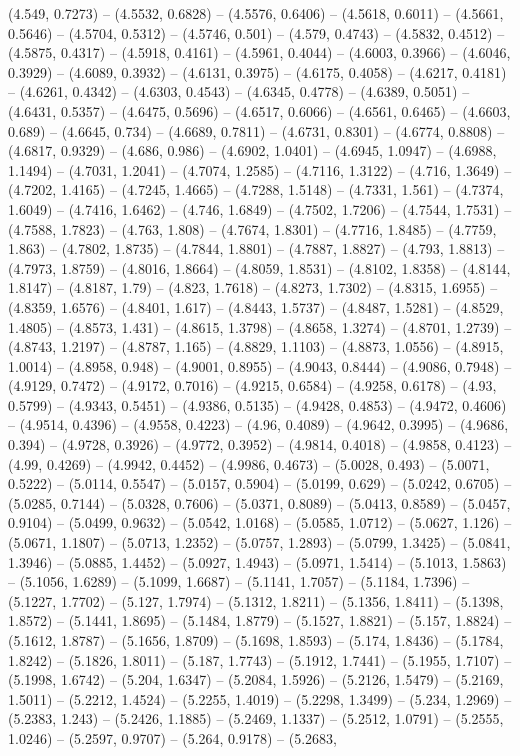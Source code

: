 (4.549, 0.7273) -- (4.5532, 0.6828) -- (4.5576, 0.6406) -- (4.5618, 0.6011) -- (4.5661, 0.5646) -- (4.5704, 0.5312) -- (4.5746, 0.501) -- (4.579, 0.4743) -- (4.5832, 0.4512) -- (4.5875, 0.4317) -- (4.5918, 0.4161) -- (4.5961, 0.4044) -- (4.6003, 0.3966) -- (4.6046, 0.3929) -- (4.6089, 0.3932) -- (4.6131, 0.3975) -- (4.6175, 0.4058) -- (4.6217, 0.4181) -- (4.6261, 0.4342) -- (4.6303, 0.4543) -- (4.6345, 0.4778) -- (4.6389, 0.5051) -- (4.6431, 0.5357) -- (4.6475, 0.5696) -- (4.6517, 0.6066) -- (4.6561, 0.6465) -- (4.6603, 0.689) -- (4.6645, 0.734) -- (4.6689, 0.7811) -- (4.6731, 0.8301) -- (4.6774, 0.8808) -- (4.6817, 0.9329) -- (4.686, 0.986) -- (4.6902, 1.0401) -- (4.6945, 1.0947) -- (4.6988, 1.1494) -- (4.7031, 1.2041) -- (4.7074, 1.2585) -- (4.7116, 1.3122) -- (4.716, 1.3649) -- (4.7202, 1.4165) -- (4.7245, 1.4665) -- (4.7288, 1.5148) -- (4.7331, 1.561) -- (4.7374, 1.6049) -- (4.7416, 1.6462) -- (4.746, 1.6849) -- (4.7502, 1.7206) -- (4.7544, 1.7531) -- (4.7588, 1.7823) -- (4.763, 1.808) -- (4.7674, 1.8301) -- (4.7716, 1.8485) -- (4.7759, 1.863) -- (4.7802, 1.8735) -- (4.7844, 1.8801) -- (4.7887, 1.8827) -- (4.793, 1.8813) -- (4.7973, 1.8759) -- (4.8016, 1.8664) -- (4.8059, 1.8531) -- (4.8102, 1.8358) -- (4.8144, 1.8147) -- (4.8187, 1.79) -- (4.823, 1.7618) -- (4.8273, 1.7302) -- (4.8315, 1.6955) -- (4.8359, 1.6576) -- (4.8401, 1.617) -- (4.8443, 1.5737) -- (4.8487, 1.5281) -- (4.8529, 1.4805) -- (4.8573, 1.431) -- (4.8615, 1.3798) -- (4.8658, 1.3274) -- (4.8701, 1.2739) -- (4.8743, 1.2197) -- (4.8787, 1.165) -- (4.8829, 1.1103) -- (4.8873, 1.0556) -- (4.8915, 1.0014) -- (4.8958, 0.948) -- (4.9001, 0.8955) -- (4.9043, 0.8444) -- (4.9086, 0.7948) -- (4.9129, 0.7472) -- (4.9172, 0.7016) -- (4.9215, 0.6584) -- (4.9258, 0.6178) -- (4.93, 0.5799) -- (4.9343, 0.5451) -- (4.9386, 0.5135) -- (4.9428, 0.4853) -- (4.9472, 0.4606) -- (4.9514, 0.4396) -- (4.9558, 0.4223) -- (4.96, 0.4089) -- (4.9642, 0.3995) -- (4.9686, 0.394) -- (4.9728, 0.3926) -- (4.9772, 0.3952) -- (4.9814, 0.4018) -- (4.9858, 0.4123) -- (4.99, 0.4269) -- (4.9942, 0.4452) -- (4.9986, 0.4673) -- (5.0028, 0.493) -- (5.0071, 0.5222) -- (5.0114, 0.5547) -- (5.0157, 0.5904) -- (5.0199, 0.629) -- (5.0242, 0.6705) -- (5.0285, 0.7144) -- (5.0328, 0.7606) -- (5.0371, 0.8089) -- (5.0413, 0.8589) -- (5.0457, 0.9104) -- (5.0499, 0.9632) -- (5.0542, 1.0168) -- (5.0585, 1.0712) -- (5.0627, 1.126) -- (5.0671, 1.1807) -- (5.0713, 1.2352) -- (5.0757, 1.2893) -- (5.0799, 1.3425) -- (5.0841, 1.3946) -- (5.0885, 1.4452) -- (5.0927, 1.4943) -- (5.0971, 1.5414) -- (5.1013, 1.5863) -- (5.1056, 1.6289) -- (5.1099, 1.6687) -- (5.1141, 1.7057) -- (5.1184, 1.7396) -- (5.1227, 1.7702) -- (5.127, 1.7974) -- (5.1312, 1.8211) -- (5.1356, 1.8411) -- (5.1398, 1.8572) -- (5.1441, 1.8695) -- (5.1484, 1.8779) -- (5.1527, 1.8821) -- (5.157, 1.8824) -- (5.1612, 1.8787) -- (5.1656, 1.8709) -- (5.1698, 1.8593) -- (5.174, 1.8436) -- (5.1784, 1.8242) -- (5.1826, 1.8011) -- (5.187, 1.7743) -- (5.1912, 1.7441) -- (5.1955, 1.7107) -- (5.1998, 1.6742) -- (5.204, 1.6347) -- (5.2084, 1.5926) -- (5.2126, 1.5479) -- (5.2169, 1.5011) -- (5.2212, 1.4524) -- (5.2255, 1.4019) -- (5.2298, 1.3499) -- (5.234, 1.2969) -- (5.2383, 1.243) -- (5.2426, 1.1885) -- (5.2469, 1.1337) -- (5.2512, 1.0791) -- (5.2555, 1.0246) -- (5.2597, 0.9707) -- (5.264, 0.9178) -- (5.2683, 